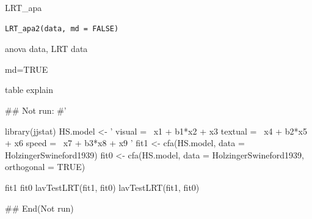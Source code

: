 \documentclass[a4paper]{book}
\begin{document}
%
\begin{Description}
LRT\_apa
\end{Description}
%
\begin{Usage}
\begin{verbatim}
LRT_apa2(data, md = FALSE)
\end{verbatim}
\end{Usage}
%
\begin{Arguments}
\begin{ldescription}
\item[\code{data}] anova data, LRT data

\item[\code{md}] md=TRUE
\end{ldescription}
\end{Arguments}
%
\begin{Value}
table explain
\end{Value}
%
\begin{Examples}
\begin{ExampleCode}

\#\# Not run: 
#'

library(jjstat)
HS.model <- '
    visual  =~ x1 + b1*x2 + x3
    textual =~ x4 + b2*x5 + x6
    speed   =~ x7 + b3*x8 + x9
'
fit1 <- cfa(HS.model, data = HolzingerSwineford1939)
fit0 <- cfa(HS.model, data = HolzingerSwineford1939,
            orthogonal = TRUE)

fit1 %
fit0 %
lavTestLRT(fit1, fit0)
lavTestLRT(fit1, fit0) %

## End(Not run)


\end{ExampleCode}
\end{Examples}
\end{document}
